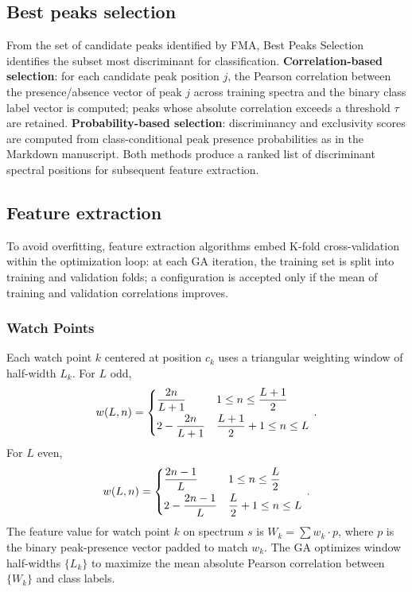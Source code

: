 \documentclass[preprint,12pt]{elsarticle}
\begin{document}
\subsection{Best peaks selection}
From the set of candidate peaks identified by FMA, Best Peaks Selection identifies the subset most discriminant for classification. \textbf{Correlation-based selection}: for each candidate peak position $j$, the Pearson correlation between the presence/absence vector of peak $j$ across training spectra and the binary class label vector is computed; peaks whose absolute correlation exceeds a threshold $\tau$ are retained. \textbf{Probability-based selection}: discriminancy and exclusivity scores are computed from class-conditional peak presence probabilities as in the Markdown manuscript. Both methods produce a ranked list of discriminant spectral positions for subsequent feature extraction.

\subsection{Feature extraction}
\label{sec:watchpoints}
To avoid overfitting, feature extraction algorithms embed K-fold cross-validation within the optimization loop: at each GA iteration, the training set is split into training and validation folds; a configuration is accepted only if the mean of training and validation correlations improves.

\subsubsection{Watch Points}
Each watch point $k$ centered at position $c_k$ uses a triangular weighting window of half-width $L_k$. For $L$ odd,
\begin{equation}
w(L,n) = \begin{cases} \dfrac{2n}{L+1} & 1 \leq n \leq \dfrac{L+1}{2} \\[\medskipamount]
2 - \dfrac{2n}{L+1} & \dfrac{L+1}{2}+1 \leq n \leq L \end{cases}\,.
\end{equation}
For $L$ even,
\begin{equation}
w(L,n) = \begin{cases} \dfrac{2n-1}{L} & 1 \leq n \leq \dfrac{L}{2} \\[\medskipamount]
2 - \dfrac{2n-1}{L} & \dfrac{L}{2}+1 \leq n \leq L \end{cases}\,.
\end{equation}
The feature value for watch point $k$ on spectrum $s$ is $W_k = \sum w_k \cdot p$, where $p$ is the binary peak-presence vector padded to match $w_k$. The GA optimizes window half-widths $\{L_k\}$ to maximize the mean absolute Pearson correlation between $\{W_k\}$ and class labels.
\end{document}
